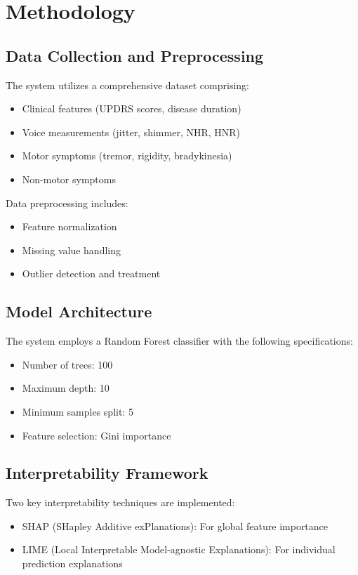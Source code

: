 \documentclass[conference]{IEEEtran}
\begin{document}
\section{Methodology}

\subsection{Data Collection and Preprocessing}
The system utilizes a comprehensive dataset comprising:
\begin{itemize}
    \item Clinical features (UPDRS scores, disease duration)
    \item Voice measurements (jitter, shimmer, NHR, HNR)
    \item Motor symptoms (tremor, rigidity, bradykinesia)
    \item Non-motor symptoms
\end{itemize}

Data preprocessing includes:
\begin{itemize}
    \item Feature normalization
    \item Missing value handling
    \item Outlier detection and treatment
\end{itemize}

\subsection{Model Architecture}
The system employs a Random Forest classifier with the following specifications:
\begin{itemize}
    \item Number of trees: 100
    \item Maximum depth: 10
    \item Minimum samples split: 5
    \item Feature selection: Gini importance
\end{itemize}

\subsection{Interpretability Framework}
Two key interpretability techniques are implemented:
\begin{itemize}
    \item SHAP (SHapley Additive exPlanations): For global feature importance
    \item LIME (Local Interpretable Model-agnostic Explanations): For individual prediction explanations
\end{itemize}
\end{document}
